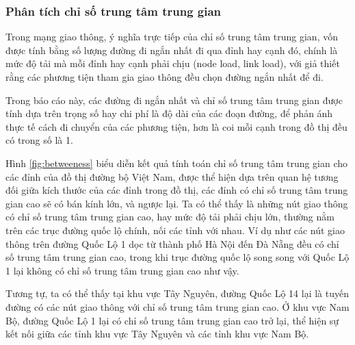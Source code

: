 \documentclass[14pt, oneside, a4paper, openany]{scrartcl}
\begin{document}
\subsubsection{Phân tích chỉ số trung tâm trung gian}
Trong mạng giao thông, ý nghĩa trực tiếp của chỉ số trung tâm trung gian, vốn được tính bằng số lượng đường đi ngắn nhất đi qua đỉnh hay cạnh đó, chính là mức độ tải mà mỗi đỉnh hay cạnh phải chịu (node load, link load), với giả thiết rằng các phương tiện tham gia giao thông đều chọn đường ngắn nhất để đi.

Trong báo cáo này, các đường đi ngắn nhất và chỉ số trung tâm trung gian được tính dựa trên trọng số hay chi phí là độ dài của các đoạn đường, để phản ánh thực tế cách đi chuyển của các phương tiện, hơn là coi mỗi cạnh trong đồ thị đều có trong số là 1.

Hình \ref{fig:betweeness} biểu diễn kết quả tính toán chỉ số trung tâm trung gian cho các đỉnh của đồ thị đường bộ Việt Nam, được thể hiện dựa trên quan hệ tương đối giữa kích thước của các đỉnh trong đồ thị, các đỉnh có chỉ số trung tâm trung gian cao sẽ có bán kính lớn, và ngược lại.
Ta có thể thấy là những nút giao thông có chỉ số trung tâm trung gian cao, hay mức độ tải phải chịu lớn, thường nằm trên các trục đường quốc lộ chính, nối các tỉnh với nhau. Ví dụ như các nút giao thông trên đường Quốc Lộ 1 dọc từ thành phố Hà Nội đến Đà Nẵng đều có chỉ số trung tâm trung gian cao, trong khi trục đường quốc lộ song song với Quốc Lộ 1 lại không có chỉ số trung tâm trung gian cao như vậy.

Tương tự, ta có thể thấy tại khu vực Tây Nguyên, đường Quốc Lộ 14 lại là tuyến đường có các nút giao thông với chỉ số trung tâm trung gian cao. Ở khu vực Nam Bộ, đường Quốc Lộ 1 lại có chỉ số trung tâm trung gian cao trở lại, thể hiện sự kết nối giữa các tỉnh khu vực Tây Nguyên và các tỉnh khu vực Nam Bộ.
\end{document}
